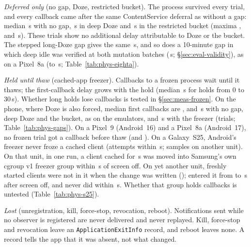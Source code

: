 \emph{Deferred only} (no gap, Doze, restricted bucket). The process survived every trial, and every callback came after the same ContentService deferral as without a gap: median \FclNone\,s with no gap, \FclDozeidle\,s in deep Doze and \FclBucket\,s in the restricted bucket (maxima \FclMaxNone, \FclMaxDozeidle and \FclMaxBucket\,s). These trials show no additional delay attributable to Doze or the bucket. The stepped long-Doze gap gives the same \FclLongdoze\,s, and so does a 10-minute gap in which deep idle was verified at both mutation batches (\FclLongdozeTwo\,s; \S\ref{sec:eval-validity}), as on a Pixel~8a (\PhysEightADozeFclMin to \PhysEightADozeFclMax\,s; Table~\ref{tab:phys-eighta}).

\emph{Held until thaw} (cached-app freezer). Callbacks to a frozen process wait until it thaws; the first-callback delay grows with the hold (median \FclFreeze\,s for holds from 0 to 30\,s). Whether long holds lose callbacks is tested in \S\ref{sec:meas-frozen}. On the phone, where Doze is also forced, median first callbacks are \PhysGapNoneFcl, \PhysGapDozeFcl and \PhysGapBucketFcl\,s with no gap, deep Doze and the bucket, as on the emulators, and \PhysGapFreezeFcl\,s with the freezer (\PhysGapTrials trials; Table~\ref{tab:phys-gaps}).\ifPhysNine{} On a Pixel~9 (Android~16) and a Pixel~8a (Android~17), no frozen trial got a callback before thaw (\PhysNineFrozenBeforeThaw and \PhysEightAFrozenBeforeThaw).\fi\ifPhysSamsung{} On a Galaxy~S25, Android's freezer never froze a cached client (\PhysSamsungFrozen attempts within \PhysSamsungFreezeWindowS\,s; \PhysSamsungLongAndroidFrozen samples on another unit). On that unit, in one run, a client cached for \PhysSamsungLongScreenOnS\,s was moved into Samsung's own cgroup v1 freezer group within \PhysSamsungLongToGroupS\,s of screen off. On yet another unit, freshly started clients were not in it when the change was written (\PhysSamsungScreenAtWrite); \PhysSamsungScreenLater entered it from \PhysSamsungScreenLaterMin to \PhysSamsungScreenLaterMax\,s after screen off, and \PhysSamsungScreenNever never did within \PhysSamsungScreenOffS\,s. Whether that group holds callbacks is untested (Table~\ref{tab:phys-s25}).\fi

\emph{Lost} (unregistration, kill, force-stop, revocation, reboot). Notifications sent while no observer is registered are never delivered and never replayed. Kill, force-stop and revocation leave an \texttt{ApplicationExitInfo} record, and reboot leaves none. A record tells the app that it was absent, not what changed.

